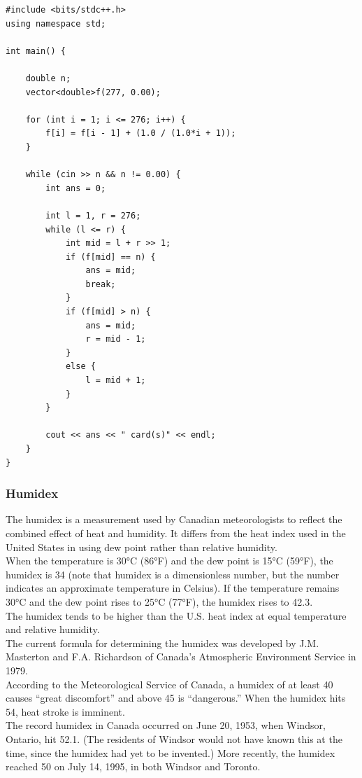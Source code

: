 \documentclass{article}
\begin{document}
\begin{lstlisting}
#include <bits/stdc++.h>
using namespace std;

int main() {

	double n;
	vector<double>f(277, 0.00);

	for (int i = 1; i <= 276; i++) {
		f[i] = f[i - 1] + (1.0 / (1.0*i + 1));
	}

	while (cin >> n && n != 0.00) {
		int ans = 0;

		int l = 1, r = 276;
		while (l <= r) {
			int mid = l + r >> 1;
			if (f[mid] == n) {
				ans = mid;
				break;
			}
			if (f[mid] > n) {
				ans = mid;
				r = mid - 1;
			}
			else {
				l = mid + 1;
			}
		}

		cout << ans << " card(s)" << endl;
	}
}
\end{lstlisting}



\subsubsection{Humidex}

The humidex is a measurement used by Canadian meteorologists to reflect the combined effect of heat and humidity. It differs from the heat index used in the United States in using dew point rather than relative humidity.\\
When the temperature is 30°C (86°F) and the dew point is 15°C (59°F), the humidex is 34 (note that humidex is a dimensionless number, but the number indicates an approximate temperature in Celsius). If the temperature remains 30°C and the dew point rises to 25°C (77°F), the
humidex rises to 42.3. \\
The humidex tends to be higher than the U.S. heat index at equal temperature and relative humidity. \\
The current formula for determining the humidex was developed by J.M. Masterton and F.A. Richardson of Canada’s Atmospheric Environment Service in 1979. \\
According to the Meteorological Service of Canada, a humidex of at least 40 causes “great discomfort” and above 45 is “dangerous.” When the humidex hits 54, heat stroke is imminent. \\
The record humidex in Canada occurred on June 20, 1953, when Windsor, Ontario, hit 52.1. (The residents of Windsor would not have known this at the time, since the humidex had yet to be invented.) More recently, the humidex reached 50 on July 14, 1995, in both Windsor and Toronto.\\
\end{document}
